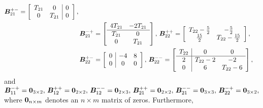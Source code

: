 \begin{align*}
	{  \boldsymbol B}_{21}^{+-} = \left[\begin{array}{cc|c}
		T_{21} & 0 & 0 \\
		0 & T_{21} & 0 
	\end{array}\right], \,
	\\&{  \boldsymbol B}_{21}^{-+} = \left[\begin{array}{cc}
		4T_{21} & -2T_{21} \\ \hline
		T_{21} & 0 \\
		0 & T_{21} 
	\end{array}\right],
	\, 
	{  \boldsymbol B}_{22}^{++} = \left[\begin{array}{cc}
		T_{22}-\frac{5}{2} & -\frac{5}{2} \\
		\frac{15}{2} & T_{22} -\frac{15}{2}
	\end{array}\right],
	\,
	\\&{  \boldsymbol B}_{22}^{+-} = \left[\begin{array}{c|cc}
		0 & -4 & 8 \\
		0 & 0 & 0 
	\end{array}\right], \,
	{  \boldsymbol B}_{22}^{--} = \left[\begin{array}{c|cc}
		T_{22} & 0 & 0\\\hline
		2 & T_{22}-2 & -2\\
		0 & 6 & T_{22}-6
	\end{array}\right],
\end{align*}
and \({  \boldsymbol B}_{11}^{-+} = \boldsymbol 0_{3\times2},\, {  \boldsymbol B}_{12}^{++} = \boldsymbol 0_{2\times2},\, {  \boldsymbol B}_{12}^{--} = \boldsymbol 0_{2\times3},\, {  \boldsymbol B}_{21}^{++} = \boldsymbol 0_{2\times 2},\, {  \boldsymbol B}_{21}^{--} = \boldsymbol 0_{3\times3},\, {  \boldsymbol B}_{22}^{-+} = \boldsymbol 0_{3\times2},\) where \(\boldsymbol 0_{n\times m}\) denotes an \(n\times m\) matrix of zeros. Furthermore, 
